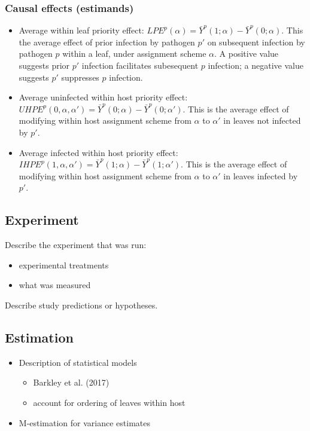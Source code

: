 \documentclass[]{article}
\providecommand{\tightlist}{%
  \setlength{\itemsep}{0pt}\setlength{\parskip}{0pt}}
\begin{document}
\hypertarget{causal-effects-estimands}{%
\subsubsection{Causal effects
(estimands)}\label{causal-effects-estimands}}

\begin{itemize}
\tightlist
\item
  Average within leaf priority effect:
  \(LPE^p(\alpha) = \bar{Y}^p(1; \alpha) - \bar{Y}^p(0; \alpha)\). This
  the average effect of prior infection by pathogen \(p'\) on subsequent
  infection by pathogen \(p\) within a leaf, under assignment scheme
  \(\alpha\). A positive value suggests prior \(p'\) infection
  facilitates subesequent \(p\) infection; a negative value suggests
  \(p'\) suppresses \(p\) infection.
\item
  Average uninfected within host priority effect:
  \(UHPE^p(0, \alpha, \alpha') = \bar{Y}^p(0; \alpha) - \bar{Y}^p(0; \alpha')\).
  This is the average effect of modifying within host assignment scheme
  from \(\alpha\) to \(\alpha'\) in leaves not infected by \(p'\).
\item
  Average infected within host priority effect:
  \(IHPE^p(1, \alpha, \alpha') = \bar{Y}^p(1; \alpha) - \bar{Y}^p(1; \alpha')\).
  This is the average effect of modifying within host assignment scheme
  from \(\alpha\) to \(\alpha'\) in leaves infected by \(p'\).
\end{itemize}

\hypertarget{experiment}{%
\subsection{Experiment}\label{experiment}}

Describe the experiment that was run:

\begin{itemize}
\tightlist
\item
  experimental treatments
\item
  what was measured
\end{itemize}

Describe study predictions or hypotheses.

\hypertarget{estimation}{%
\subsection{Estimation}\label{estimation}}

\begin{itemize}
\tightlist
\item
  Description of statistical models

  \begin{itemize}
  \tightlist
  \item
    Barkley et al. (2017)
  \item
    account for ordering of leaves within host
  \end{itemize}
\item
  M-estimation for variance estimates
\end{itemize}
\end{document}
